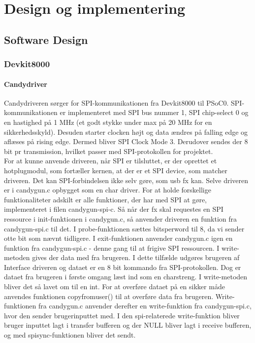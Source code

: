 \chapter{Design og implementering}

\section{Software Design}

\subsection{Devkit8000}

\subsubsection{Candydriver}
Candydriveren sørger for SPI-kommunikationen fra Devkit8000 til PSoC0. SPI-kommunikationen er implementeret med SPI bus nummer 1, SPI chip-select 0 og en hastighed på 1 MHz (et godt stykke under max på 20 MHz for en sikkerhedsskyld). Desuden starter clocken højt og data ændres på falling edge og aflæses på rising edge. Dermed bliver SPI Clock Mode 3. Derudover sendes der 8 bit pr transmission, hvilket passer med SPI-protokollen for projektet.\\
For at kunne anvende driveren, når SPI er tilsluttet, er der oprettet et hotplugmodul, som fortæller kernen, at der er et SPI device, som matcher driveren. Det kan SPI-forbindelsen ikke selv gøre, som usb fx kan. Selve driveren er i candygun.c opbygget som en char driver. For at holde forskellige funktionaliteter adskilt er alle funktioner, der har med SPI at gøre, implementeret i filen candygun-spi-c. Så når der fx skal requestes en SPI ressource i init-funktionen i candygun.c, så anvender driveren en funktion fra candygun-spi.c til det. I probe-funktionen sættes bits\textunderscore per\textunderscore word til 8, da vi sender otte bit som nævnt tidligere. I exit-funktionen anvender candygun.c igen en funktion fra candygun-spi.c - denne gang til at frigive SPI ressourcen. I write-metoden gives der data med fra brugeren. I dette tilfælde udgøres brugeren af Interface driveren og dataet er en 8 bit kommando fra SPI-protokollen. Dog er dataet fra brugeren i første omgang læst ind som en charstreng. I write-metoden bliver det så lavet om til en int.  For at overføre dataet på en sikker måde anvendes funktionen copy\textunderscore from\textunderscore user() til at overføre data fra brugeren. Write-funktionen fra candygun.c anvender derefter en write-funktion fra candygun-spi.c, hvor den sender brugerinputtet med. I den spi-relaterede write-funktion bliver bruger inputtet lagt i transfer bufferen og der NULL bliver lagt i receive bufferen, og med spi\textunderscore sync-funktionen bliver det sendt. \\ 
